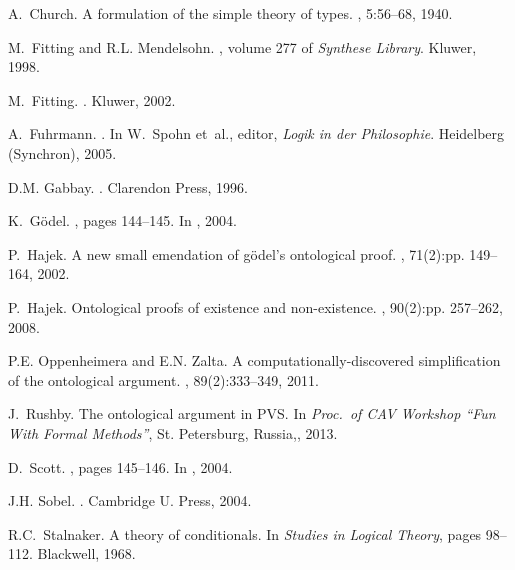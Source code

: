 \documentclass{llncs}
\begin{document}
\begin{thebibliography}{10}
A.~Church.
\newblock A formulation of the simple theory of types.
, 5:56--68, 1940.

M.~Fitting and R.L. Mendelsohn.
, volume 277 of {\em Synthese Library}.
\newblock Kluwer, 1998.

M.~Fitting.
.
\newblock Kluwer, 2002.

A.~Fuhrmann.
.
\newblock In W.~Spohn et~al., editor, {\em Logik in der Philosophie}.
  Heidelberg (Synchron), 2005.

D.M. Gabbay.
.
\newblock Clarendon Press, 1996.

K.~G\"odel.
, pages 144--145.
\newblock In  \cite{sobel2004logic}, 2004.

P.~Hajek.
\newblock A new small emendation of g\"odel's ontological proof.
,
  71(2):pp. 149--164, 2002.

P.~Hajek.
\newblock Ontological proofs of existence and non-existence.
,
  90(2):pp. 257--262, 2008.

P.E. Oppenheimera and E.N. Zalta.
\newblock A computationally-discovered simplification of the ontological
  argument.
, 89(2):333--349, 2011.

J.~Rushby.
\newblock The ontological argument in {PVS}.
\newblock In {\em Proc.~of CAV Workshop ``Fun With Formal Methods''}, St.
  Petersburg, Russia,, 2013.

D.~Scott.
, pages 145--146.
\newblock In  \cite{sobel2004logic}, 2004.

J.H. Sobel.
.
\newblock Cambridge U. Press, 2004.

R.C.~Stalnaker.
\newblock A theory of conditionals.
\newblock In {\em Studies in Logical Theory}, pages 98--112. Blackwell, 1968.

\end{thebibliography}
\end{document}
